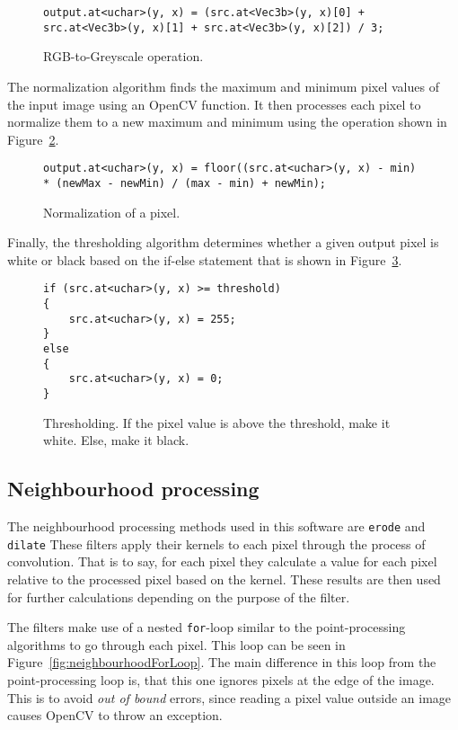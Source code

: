 \begin{figure}[!h]
\begin{lstlisting}
output.at<uchar>(y, x) = (src.at<Vec3b>(y, x)[0] + src.at<Vec3b>(y, x)[1] + src.at<Vec3b>(y, x)[2]) / 3;
\end{lstlisting}
\caption{RGB-to-Greyscale operation.\label{fig:rgb2gray}}
\end{figure}

The normalization algorithm finds the maximum and minimum pixel values of the input image using an OpenCV function. It then processes each pixel to normalize them to a new maximum and minimum using the operation shown in Figure~\ref{fig:normalize}.

\begin{figure}
\begin{lstlisting}
output.at<uchar>(y, x) = floor((src.at<uchar>(y, x) - min) * (newMax - newMin) / (max - min) + newMin);
\end{lstlisting}
\caption{Normalization of a pixel. \label{fig:normalize}}
\end{figure} 

Finally, the thresholding algorithm determines whether a given output pixel is white or black based on the if-else statement that is shown in Figure~\ref{fig:threshold}.

\begin{figure}
\begin{lstlisting}
if (src.at<uchar>(y, x) >= threshold)
{
	src.at<uchar>(y, x) = 255;
}
else
{
	src.at<uchar>(y, x) = 0;
}
\end{lstlisting}
\caption{Thresholding. If the pixel value is above the threshold, make it white. Else, make it black.\label{fig:threshold}}
\end{figure}

\subsection{Neighbourhood processing}
The neighbourhood processing methods used in this software are \texttt{erode} and \texttt{dilate} These filters apply their kernels to each pixel through the process of convolution. That is to say, for each pixel they calculate a value for each pixel relative to the processed pixel based on the kernel. These results are then used for further calculations depending on the purpose of the filter. 	

The filters make use of a nested \texttt{for}-loop similar to the point-processing algorithms to go through each pixel. This loop can be seen in Figure~\ref{fig:neighbourhoodForLoop}. The main difference in this loop from the point-processing loop is, that this one ignores pixels at the edge of the image. This is to avoid \textit{out of bound} errors, since reading a pixel value outside an image causes OpenCV to throw an exception.

